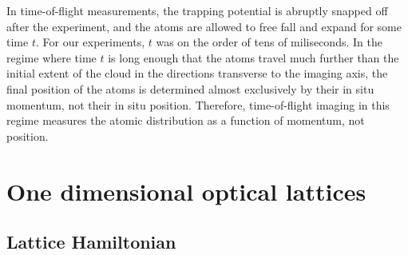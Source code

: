 In time-of-flight measurements, the trapping potential is abruptly snapped off after the experiment, and the atoms are allowed to free fall and expand for some time $t$. For our experiments, $t$ was on the order of tens of miliseconds. In the regime where time $t$ is long enough that the atoms travel much further than the initial extent of the cloud in the directions transverse to the imaging axis, the final position of the atoms is determined almost exclusively by their in situ momentum, not their in situ position. Therefore, time-of-flight imaging in this regime measures the atomic distribution as a function of momentum, not position.  

\section{One dimensional optical lattices}\label{chap:4sec:1DOL}

\subsection{Lattice Hamiltonian}

